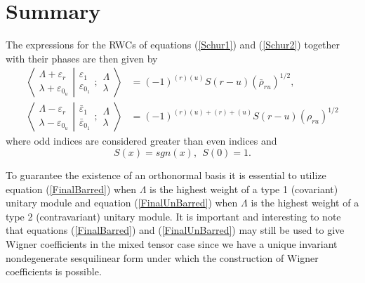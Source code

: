 \documentclass[12pt]{article}
\begin{document}
\section{Summary}

The expressions for the RWCs of equations (\ref{Schur1}) and (\ref{Schur2}) together with their phases \cite{GIW2,GIW3} are then given by
\begin{align}
\left\langle\left. 
\begin{array}{c} \Lambda+\varepsilon_r\\ \lambda+\varepsilon_{0_u} 
 \end{array}
\right|\right.
\left.
\begin{array}{c} \varepsilon_1 \\ \varepsilon_{0_1} 
 \end{array}
; \begin{array}{c} \Lambda \\ \lambda
 \end{array}
\right\rangle &= (-1)^{(r)(u)} S(r-u) (\bar{\rho}_{ru})^{1/2}
,  \label{FinalBarred} \\
\left\langle\left. 
\begin{array}{c} \Lambda-\varepsilon_r\\ \lambda-\varepsilon_{0_u} 
 \end{array}
\right|\right.
\left.
\begin{array}{c} \bar{\varepsilon}_1 \\ \bar{\varepsilon}_{0_1} 
 \end{array}
; \begin{array}{c} \Lambda \\ \lambda
 \end{array}
\right\rangle &= (-1)^{(r)(u) +(r) + (u)} S(r-u) ({\rho_{ru}})^{1/2} \label{FinalUnBarred}
\end{align}
where odd indices are considered greater than even indices and
$$
S(x) = sgn(x),~~S(0)=1.
$$

To guarantee the existence of an orthonormal basis it is essential to utilize equation (\ref{FinalBarred}) when $\Lambda$ is the highest weight of a type 1 (covariant) unitary module and equation (\ref{FinalUnBarred}) when $\Lambda$ is the highest weight of a type 2 (contravariant) unitary module. It is important and interesting to note that equations (\ref{FinalBarred}) and (\ref{FinalUnBarred}) may still be used to give Wigner coefficients in the mixed tensor case since we have a unique invariant nondegenerate sesquilinear form under which the construction of Wigner coefficients is possible.
\end{document}
